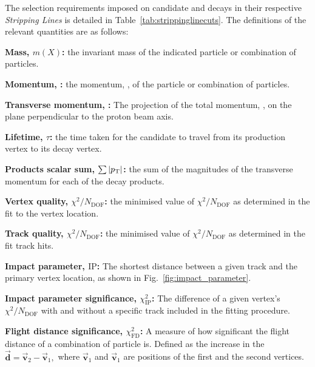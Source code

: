 The selection requirements imposed on candidate \decay{\Bp}{\Dsp\phiz} and \decay{\Bp}{\Dsp\Kp\Km} decays in their respective \emph{Stripping Lines} is detailed in Table~\ref{tab:strippinglinecuts}. The definitions of the relevant quantities are as follows:
\begin{description}
\item \textbf{Mass, $m(X)$:} the invariant mass of the indicated particle or combination of particles. 
\item \textbf{Momentum, \ptot:} the momentum, \ptot, of the particle or combination of particles.
\item \textbf{Transverse momentum, \pt:} The projection of the total momentum, \ptot, on the plane perpendicular to the proton beam axis.

\item \textbf{Lifetime, $\tau$:} the time taken for the candidate to travel from its production vertex to its decay vertex.

\item \textbf{Products \pt scalar sum, $\sum{|\pt|}$:} the sum of the magnitudes of the transverse momentum for each of the decay products.
\item \textbf{Vertex quality, $\chi^{2}/N_{\text{DOF}}$:} the minimised value of $\chi^{2}/N_{\text{DOF}}$ as determined in the fit to the vertex location.

\item \textbf{Track quality, $\chi^{2}/N_{\text{DOF}}$:} the minimised value of $\chi^{2}/N_{\text{DOF}}$ as determined in the fit track hits.

\item \textbf{Impact parameter, $\text{IP}$:} The shortest distance between a given track and the primary vertex location, as shown in Fig.~\ref{fig:impact_parameter}. 
\item \textbf{Impact parameter significance, $\chi^{2}_{\text{IP}}$:} The difference of a given vertex's $\chi^{2}/N_{\text{DOF}}$ with and without a specific track included in the fitting procedure.

\item \textbf{Flight distance significance, $\chi^{2}_{\text{FD}}$:} A measure of how significant the flight distance of a combination of particle is. Defined as the increase in the  
$ \vec{\mathbf{d}} = \vec{\mathbf{v}}_2 - \vec{\mathbf{v}}_1,$ where  $\vec{\mathbf{v}}_1$ and $\vec{\mathbf{v}}_1$ are positions of the first and the second vertices. 



\end{description}
